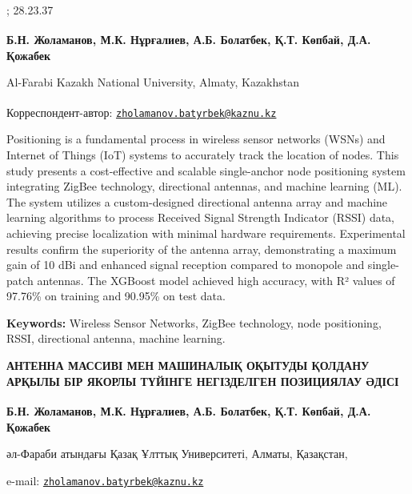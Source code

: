 ; 28.23.37

\begin{articleheader}

{\bfseries
Б.Н. Жоламанов\textsuperscript{\envelope },
М.К. Нұрғалиев,
А.Б. Болатбек,
Қ.Т. Көпбай,
Д.А. Қожабек
}
\end{articleheader}

\begin{affiliation}
Al-Farabi Kazakh National University, Almaty, Kazakhstan

\raggedright \textsuperscript{\envelope }Корреспондент-автор: \href{mailto:zholamanov.batyrbek@kaznu.kz}{\nolinkurl{zholamanov.batyrbek@kaznu.kz}}
\end{affiliation}

Positioning is a fundamental process in wireless sensor networks (WSNs)
and Internet of Things (IoT) systems to accurately track the location of
nodes. This study presents a cost-effective and scalable single-anchor
node positioning system integrating ZigBee technology, directional
antennas, and machine learning (ML). The system utilizes a
custom-designed directional antenna array and machine learning
algorithms to process Received Signal Strength Indicator (RSSI) data,
achieving precise localization with minimal hardware requirements.
Experimental results confirm the superiority of the antenna array,
demonstrating a maximum gain of 10 dBi and enhanced signal reception
compared to monopole and single-patch antennas. The XGBoost model
achieved high accuracy, with R² values of 97.76\% on training and
90.95\% on test data.

{\bfseries Keywords:} Wireless Sensor Networks, ZigBee technology, node
positioning, RSSI, directional antenna, machine learning.

\begin{articleheader}
{\bfseries АНТЕННА МАССИВІ МЕН МАШИНАЛЫҚ ОҚЫТУДЫ ҚОЛДАНУ АРҚЫЛЫ БІР ЯКОРЛЫ
ТҮЙІНГЕ НЕГІЗДЕЛГЕН ПОЗИЦИЯЛАУ ӘДІСІ}

{\bfseries
Б.Н. Жоламанов\textsuperscript{\envelope },
М.К. Нұрғалиев,
А.Б. Болатбек,
Қ.Т. Көпбай,
Д.А. Қожабек
}
\end{articleheader}

\begin{affiliation}
әл-Фараби атындағы Қазақ Ұлттық Университеті, Алматы, Қазақстан,

e-mail: \href{mailto:zholamanov.batyrbek@kaznu.kz}{\nolinkurl{zholamanov.batyrbek@kaznu.kz}}
\end{affiliation}

